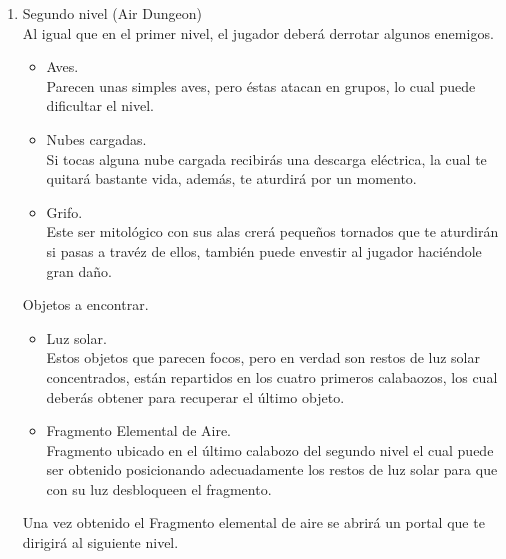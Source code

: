 \documentclass{article}
\begin{document}
\begin{enumerate}
    \item Segundo nivel (Air Dungeon)\\
    Al igual que en el primer nivel, el jugador deberá derrotar algunos enemigos.
    \begin{itemize}
        \item Aves.\\
        Parecen unas simples aves, pero éstas atacan en grupos, lo cual puede dificultar el nivel.
        \item Nubes cargadas.\\
        Si tocas alguna nube cargada recibirás una descarga eléctrica, la cual te quitará bastante vida, además, te aturdirá por un momento.
        \item Grifo.\\
        Este ser mitológico con sus alas crerá pequeños tornados que te aturdirán si pasas a travéz de ellos, también puede envestir al jugador haciéndole gran daño.
    \end{itemize}
    Objetos a encontrar.
    \begin{itemize}
        \item Luz solar.\\
        Estos objetos que parecen focos, pero en verdad son restos de luz solar concentrados, están repartidos en los cuatro primeros calabaozos, los cual deberás obtener para recuperar el último objeto.
        \item Fragmento Elemental de Aire.\\
        Fragmento ubicado en el último calabozo del segundo nivel el cual puede ser obtenido posicionando adecuadamente los restos de luz solar para que con su luz desbloqueen el fragmento.
    \end{itemize}
    Una vez obtenido el Fragmento elemental de aire se abrirá un portal que te dirigirá al siguiente nivel.
    

\end{enumerate}
\end{document}
